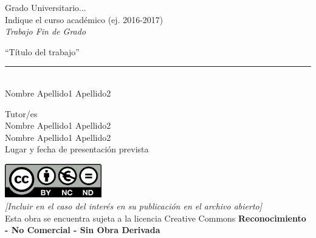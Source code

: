 \documentclass[12pt]{report} %
\begin{document}
	
	\begin{titlepage}
		\begin{sffamily}
			\color{azulUC3M}
			\begin{center}
				\begin{figure}[H] %
				\end{figure}
				\vspace{2.5cm}
				\begin{Large}
					Grado Universitario...\\			
					Indique el curso académico (ej. 2016-2017)\\
					\vspace{2cm}		
					\textsl{Trabajo Fin de Grado}
					\bigskip
					
				\end{Large}
				{\Huge ``Título del trabajo''}\\
				\vspace*{0.5cm}
				\rule{10.5cm}{0.1mm}\\
				\vspace*{0.9cm}
				{\LARGE Nombre Apellido1 Apellido2}\\ 
				\vspace*{1cm}
				\begin{Large}
					Tutor/es\\
					Nombre Apellido1 Apellido2\\
					Nombre Apellido1 Apellido2\\
					Lugar y fecha de presentación prevista\\
				\end{Large}
			\end{center}
			\vfill
			\color{black}
			\includegraphics[width=4.2cm]{imagenes/creativecommons.png}\\ %
			\emph{[Incluir en el caso del interés en su publicación en el archivo abierto]}\\  %
			Esta obra se encuentra sujeta a la licencia Creative Commons \textbf{Reconocimiento - No Comercial - Sin Obra Derivada}
		\end{sffamily}
	\end{titlepage}
	
\end{document}
